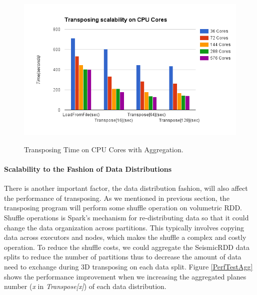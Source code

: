 \begin{figure}[h]
\centering
\includegraphics[scale=0.7]{figures/PerfTestCoresAgg.png}\\
\caption{Transposing Time on CPU Cores with Aggregation.}\label{PerfTestCoresAgg}
\end{figure}


\paragraph{Scalability to the Fashion of Data Distributions}

There is another important factor, the data distribution fashion, will also affect the performance of transposing. As we mentioned in previous section, the transposing program will perform some shuffle operation on volumetric RDD. Shuffle operations \cite{SparkShuffle} is Spark's mechanism for re-distributing data so that it could change the data organization across partitions. This typically involves copying data across executors and nodes, which makes the shuffle a complex and costly operation. To reduce the shuffle costs, we could aggregate the SeismicRDD data splits to reduce the number of partitions thus to decrease the amount of data need to exchange during 3D transposing on each data split. Figure \ref{PerfTestAgg} shows the performance improvement when we increasing the aggregated planes number (\emph{x} in \emph{Transpose[x]}) of each data distribution. 


